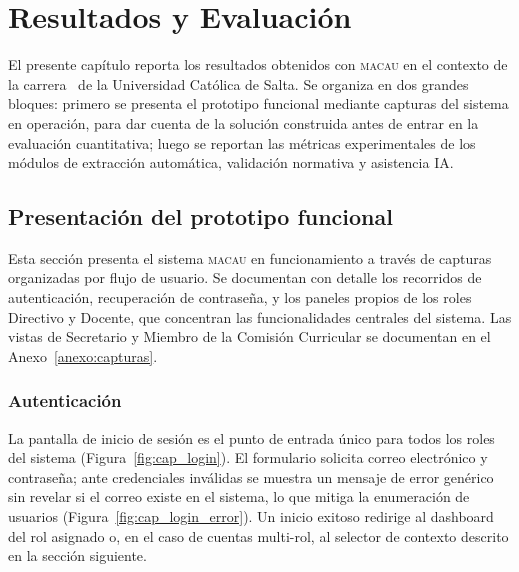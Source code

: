 \chapter{Resultados y Evaluación}
\label{ch:resultados}

El presente capítulo reporta los resultados obtenidos con \textsc{macau} en el
contexto de la carrera \programaTesis\ de la Universidad Católica de Salta.
Se organiza en dos grandes bloques: primero se presenta el prototipo funcional
mediante capturas del sistema en operación, para dar cuenta de la solución
construida antes de entrar en la evaluación cuantitativa; luego se reportan
las métricas experimentales de los módulos de extracción automática, validación
normativa y asistencia IA.

\section{Presentación del prototipo funcional}
\label{sec:prototipo}

Esta sección presenta el sistema \textsc{macau} en funcionamiento a través de
capturas organizadas por flujo de usuario. Se documentan con detalle los
recorridos de autenticación, recuperación de contraseña, y los paneles
propios de los roles Directivo y Docente, que concentran las funcionalidades
centrales del sistema. Las vistas de Secretario y Miembro de la Comisión
Curricular se documentan en el Anexo~\ref{anexo:capturas}.

\subsection{Autenticación}
\label{subsec:cap_autenticacion}

La pantalla de inicio de sesión es el punto de entrada único para todos los
roles del sistema (Figura~\ref{fig:cap_login}). El formulario solicita correo
electrónico y contraseña; ante credenciales inválidas se muestra un mensaje
de error genérico sin revelar si el correo existe en el sistema, lo que
mitiga la enumeración de usuarios (Figura~\ref{fig:cap_login_error}).
Un inicio exitoso redirige al dashboard del rol asignado o, en el caso de
cuentas multi-rol, al selector de contexto descrito en la sección siguiente.

